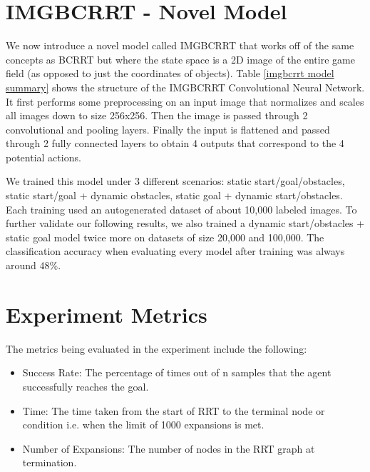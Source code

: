 \documentclass{article}
\begin{document}
\section{IMGBCRRT - Novel Model}

We now introduce a novel model called IMGBCRRT that works off of the same concepts as BCRRT but where the state space is a 2D image of the entire game field (as opposed to just the coordinates of objects). 
Table \ref{imgbcrrt model summary} shows the structure of the IMGBCRRT Convolutional Neural Network. It first performs some preprocessing on an input image that normalizes and scales all images down to size 256x256. Then the image is passed through 2 convolutional and pooling layers. Finally the input is flattened and passed through 2 fully connected layers to obtain 4 outputs that correspond to the 4 potential actions.

We trained this model under 3 different scenarios: static start/goal/obstacles, static start/goal + dynamic obstacles, static goal + dynamic start/obstacles. Each training used an autogenerated dataset of about 10,000 labeled images. 
To further validate our following results, we also trained a dynamic start/obstacles + static goal model twice more on datasets of size 20,000 and 100,000. The classification accuracy when evaluating every model after training was always around 48\%.

\section{Experiment Metrics}

The metrics being evaluated in the experiment include the following:
\begin{itemize}
	\item{Success Rate: The percentage of times out of n samples that the agent successfully reaches the goal.}
	\item{Time: The time taken from the start of RRT to the terminal node or condition i.e. when the limit of 1000 expansions is met.}
	\item{Number of Expansions: The number of nodes in the RRT graph at termination.}
\end{itemize}
\end{document}
